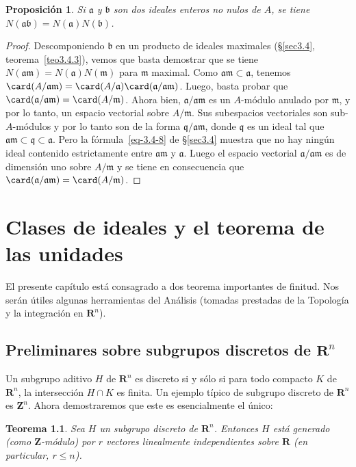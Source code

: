 \documentclass[oneside,bibtotoc,leqno,spanish]{amsbook}
\newcommand{\RR}{\mathbf{R}}
\newcommand{\ZZ}{\mathbf{Z}}
\newcommand{\idl}[1]{\mathfrak{#1}}
\newcommand{\QED}{}%
\numberwithin{equation}{section}
\theoremstyle{defi}
\theoremstyle{note}
\newtheorem{theorem}{Teorema}
\newtheorem{proposition}{Proposici\'on}
\theoremstyle{rem}
\numberwithin{theorem}{section}
\numberwithin{proposition}{section}
\numberwithin{definition}{section}
\numberwithin{lemma}{section}
\numberwithin{corollary}{section}
\numberwithin{example}{section}
\numberwithin{footnote}{section}%
\begin{document}
\begin{proposition}\label{prop3.5.2}
Si $\idl{a}$ y $\idl{b}$ son dos ideales enteros no nulos de $A$, se tiene
$N(\idl{a}\idl{b}) = N(\idl{a})N(\idl{b})$.
\end{proposition}

\begin{proof}
Descomponiendo $\idl{b}$ en un producto de ideales maximales (\S\ref{sec3.4}, teorema~\ref{teo3.4.3}), vemos que
basta demostrar que se tiene $N(\idl{a}\idl{m}) = N(\idl{a})N(\idl{m})$ para $\idl{m}$ maximal.
Como $\idl{a}\idl{m}\subset\idl{a}$, tenemos $\card(A/\idl{a}\idl{m}) =
\card(A/\idl{a})\card(\idl{a}/\idl{a}\idl{m})$. Luego, basta probar que $\card(\idl{a}/\idl{a}\idl{m})
=\card(A/\idl{m})$. Ahora bien, $\idl{a}/\idl{a}\idl{m}$ es un $A$-m\'odulo anulado por $\idl{m}$, y por
lo tanto, un espacio vectorial sobre $A/\idl{m}$. Sus subespacios vectoriales son sub-$A$-m\'odulos y por
lo tanto son de la forma $\idl{q}/\idl{a}\idl{m}$, donde $\idl{q}$ es un ideal tal que
$\idl{a}\idl{m}\subset\idl{q}\subset\idl{a}$. Pero la f\'ormula~\eqref{eq-3.4-8} de \S\ref{sec3.4}
muestra que no hay
ning\'un ideal contenido estrictamente entre $\idl{a}\idl{m}$ y $\idl{a}$. Luego el espacio vectorial
$\idl{a}/\idl{a}\idl{m}$ es de dimensi\'on uno sobre $A/\idl{m}$ y se tiene en consecuencia que
$\card(\idl{a}/\idl{a}\idl{m}) = \card(A/\idl{m})$. \QED
\end{proof}

\chapter{Clases de ideales y el teorema de las unidades}\label{cap4}

El presente cap\'itulo est\'a consagrado a dos teorema importantes de finitud. Nos ser\'an
\'utiles algunas herramientas del An\'alisis (tomadas prestadas de la Topolog\'ia y la integraci\'on
en $\RR^{n}$).

\section{Preliminares sobre subgrupos discretos de $\RR^{n}$}\label{sec4.1}

Un subgrupo aditivo $H$ de $\RR^{n}$ es discreto si y s\'olo si para todo compacto $K$ de $\RR^{n}$,
la intersecci\'on $H\cap K$ es finita. Un ejemplo t\'ipico de subgrupo discreto de $\RR^{n}$ es $\ZZ^{n}$.
Ahora demostraremos que este es esencialmente el \'unico:

\begin{theorem}\label{teo4.1.1}
Sea $H$ un subgrupo discreto de $\RR^{n}$. Entonces $H$ est\'a generado {\upshape(}como $\ZZ$-m\'odulo\/{\upshape)} por
$r$ vectores linealmente independientes sobre $\RR$ {\upshape(}en particular, $r\leq n${\upshape).}
\end{theorem}
\end{document}
